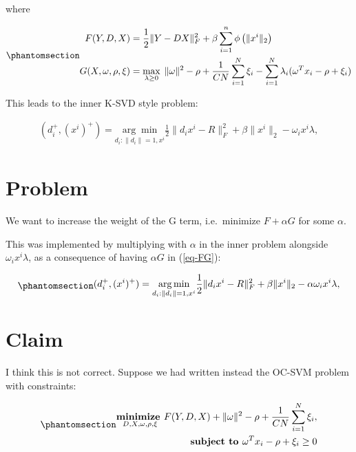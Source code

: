 \documentclass[
  letterpaper,
  DIV=11,
  numbers=noendperiod]{scrartcl}
\begin{document}
where

\begin{equation}\phantomsection\label{eq-FG}{
\begin{align}
F(Y, D, X)  &= \frac12 \|Y - DX\|_F^2
  + \beta \sum_{i=1}^{n} \phi\left(\|x^i\|_2\right)  \\
G(X, \omega, \rho, \xi) &=\max\limits_{\lambda \ge 0} \; \|\omega\|^2 - \rho + \frac{1}{CN} \sum_{i=1}^{N} \xi_i
- \sum_{i=1}^{N} \lambda_i (\omega^T x_i - \rho + \xi_i)
\end{align}
}\end{equation}

This leads to the inner K-SVD style problem:

\[
\begin{align}
(d^+_i,(x^i)^+) = \underset{d_i: \|d_i\|=1,x^i}{\arg\min} \frac12\|d_ix^i - R\|_F^2  + \beta\|x^i\|_2 - \omega_i x^i\lambda ,
\end{align}
\]

\section{Problem}\label{problem}

We want to increase the weight of the G term, i.e.~minimize
\(F + \alpha G\) for some \(\alpha\).

This was implemented by multiplying with \(\alpha\) in the inner problem
alongside \(\omega_i x^i \lambda\), as a consequence of having
\(\alpha G\) in (\ref{eq-FG}):

\begin{equation}\phantomsection\label{eq-inner}{
\begin{align}
(d^+_i,(x^i)^+) = \underset{d_i: \|d_i\|=1,x^i}{\arg\min} \frac12\|d_ix^i - R\|_F^2  + \beta\|x^i\|_2 - \alpha \omega_i x^i\lambda ,
\end{align}
}\end{equation}

\section{Claim}\label{claim}

I think this is not correct. Suppose we had written instead the OC-SVM
problem with constraints:

\begin{equation}\phantomsection\label{eq-OCSVMconstr}{
\begin{align}
\underset{D, X, \omega, \rho, \xi}{\textbf{minimize  }} F(Y, D, X) + \|\omega\|^2 - \rho + \frac{1}{CN} \sum_{i=1}^{N} \xi_i, \\
\textbf{subject to  } \omega^T x_i - \rho + \xi_i \geq 0\\
\end{align}
}\end{equation}
\end{document}
